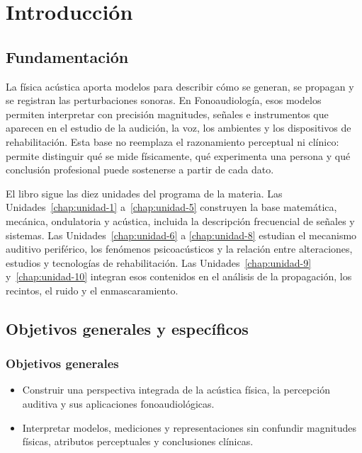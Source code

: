 \chapter*{Introducción}
{}

\section*{Fundamentación}

La física acústica aporta modelos para describir cómo se generan, se propagan
y se registran las perturbaciones sonoras. En Fonoaudiología, esos modelos
permiten interpretar con precisión magnitudes, señales e instrumentos que
aparecen en el estudio de la audición, la voz, los ambientes y los
dispositivos de rehabilitación. Esta base no reemplaza el razonamiento
perceptual ni clínico: permite distinguir qué se mide físicamente, qué
experimenta una persona y qué conclusión profesional puede sostenerse a
partir de cada dato.

El libro sigue las diez unidades del programa de la materia. Las
Unidades~\ref{chap:unidad-1} a~\ref{chap:unidad-5} construyen la base
matemática, mecánica, ondulatoria y acústica, incluida la descripción
frecuencial de señales y sistemas. Las Unidades~\ref{chap:unidad-6} a
\ref{chap:unidad-8} estudian el mecanismo auditivo periférico, los fenómenos
psicoacústicos y la relación entre alteraciones, estudios y tecnologías de
rehabilitación. Las Unidades~\ref{chap:unidad-9} y~\ref{chap:unidad-10}
integran esos contenidos en el análisis de la propagación, los recintos, el
ruido y el enmascaramiento.

\section*{Objetivos generales y específicos}

\subsection*{Objetivos generales}

\begin{itemize}
    \setlength\itemsep{0.3em}
    \item Construir una perspectiva integrada de la acústica física, la
    percepción auditiva y sus aplicaciones fonoaudiológicas.
    \item Interpretar modelos, mediciones y representaciones sin confundir
    magnitudes físicas, atributos perceptuales y conclusiones clínicas.
\end{itemize}

